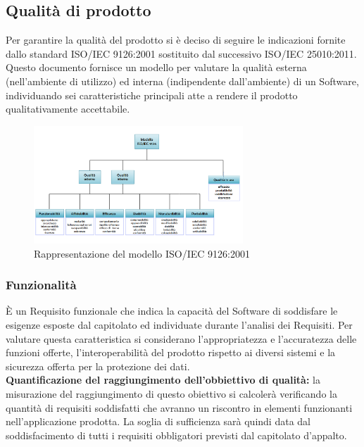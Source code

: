 \subsection{Qualità di prodotto}
Per garantire la qualità del prodotto si è deciso di seguire le indicazioni fornite dallo standard ISO/IEC 9126:2001 sostituito dal successivo ISO/IEC 25010:2011. Questo documento fornisce un modello per valutare la qualità esterna (nell’ambiente di utilizzo) ed interna (indipendente dall’ambiente) di un Software, individuando sei caratteristiche principali atte a rendere il prodotto qualitativamente accettabile.

\begin{figure}[h]
  \centering
    \includegraphics[width=0.7\textwidth]{./images/ISO-IEC_9126}
  \caption{Rappresentazione del modello ISO/IEC 9126:2001}
  \label{fig:ISO-IEC_9126}
\end{figure}


\subsubsection{Funzionalità}
È un Requisito funzionale che indica la capacità del Software di soddisfare le esigenze esposte dal capitolato ed individuate durante l’analisi dei Requisiti. Per valutare questa caratteristica si considerano l'appropriatezza e l'accuratezza delle funzioni offerte, l'interoperabilità del prodotto rispetto ai diversi sistemi e la sicurezza offerta per la protezione dei dati.\\ 
\textbf{Quantificazione del raggiungimento dell’obbiettivo di qualità:} la misurazione
del raggiungimento di questo obiettivo si calcolerà verificando la quantità
di requisiti soddisfatti che avranno un riscontro in elementi funzionanti
nell’applicazione prodotta. La soglia di sufficienza sarà quindi data dal soddisfacimento
di tutti i requisiti obbligatori previsti dal capitolato d’appalto.

